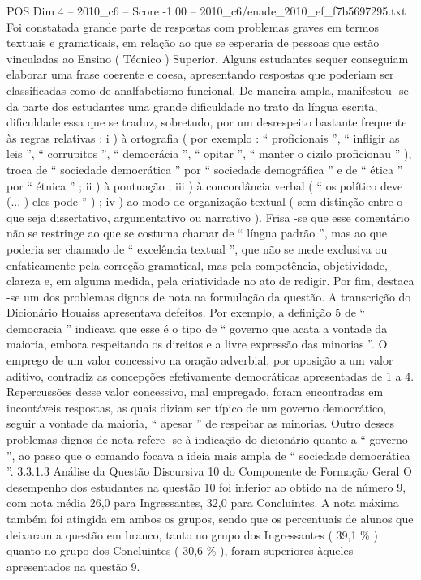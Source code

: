 \begin{textsample}{POS Dim 4 – 2010\_c6 – Score -1.00 – 2010\_c6/enade\_2010\_ef\_f7b5697295.txt}
Foi constatada grande parte de respostas com problemas graves em termos textuais e gramaticais, em relação ao que se esperaria de pessoas que estão vinculadas ao Ensino ( Técnico ) Superior.
Alguns estudantes sequer conseguiam elaborar uma frase coerente e coesa, apresentando respostas que poderiam ser classificadas como de analfabetismo funcional.
De maneira ampla, manifestou -se da parte dos estudantes uma grande dificuldade no trato da língua escrita, dificuldade essa que se traduz, sobretudo, por um desrespeito bastante frequente às regras relativas : i ) à ortografia ( por exemplo : “ proficionais ”, “ infligir as leis ”, “ corrupitos ”, “ democrácia ”, “ opitar ”, “ manter o cizilo proficionau ” ), troca de “ sociedade democrática ” por “ sociedade demográfica ” e de “ ética ” por “ étnica ” ; ii ) à pontuação ; iii ) à concordância verbal ( “ os político deve (... ) eles pode ” ) ; iv ) ao modo de organização textual ( sem distinção entre o que seja dissertativo, argumentativo ou narrativo ).
Frisa -se que esse comentário não se restringe ao que se costuma chamar de “ língua padrão ”, mas ao que poderia ser chamado de “ excelência textual ”, que não se mede exclusiva ou enfaticamente pela correção gramatical, mas pela competência, objetividade, clareza e, em alguma medida, pela criatividade no ato de redigir.
Por fim, destaca -se um dos problemas dignos de nota na formulação da questão.
A transcrição do Dicionário Houaiss apresentava defeitos.
Por exemplo, a definição 5 de “ democracia ” indicava que esse é o tipo de “ governo que acata a vontade da maioria, embora respeitando os direitos e a livre expressão das minorias ”.
O emprego de um valor concessivo na oração adverbial, por oposição a um valor aditivo, contradiz as concepções efetivamente democráticas apresentadas de 1 a 4.
Repercussões desse valor concessivo, mal empregado, foram encontradas em incontáveis respostas, as quais diziam ser típico de um governo democrático, seguir a vontade da maioria, “ apesar ” de respeitar as minorias.
Outro desses problemas dignos de nota refere -se à indicação do dicionário quanto a “ governo ”, ao passo que o comando focava a ideia mais ampla de “ sociedade democrática ”. 3.3.1.3 Análise da Questão Discursiva 10 do Componente de Formação Geral O desempenho dos estudantes na questão 10 foi inferior ao obtido na de número 9, com nota média 26,0 para Ingressantes, 32,0 para Concluintes.
A nota máxima também foi atingida em ambos os grupos, sendo que os percentuais de alunos que deixaram a questão em branco, tanto no grupo dos Ingressantes ( 39,1 \% ) quanto no grupo dos Concluintes ( 30,6 \% ), foram superiores àqueles apresentados na questão 9.

\end{textsample}
